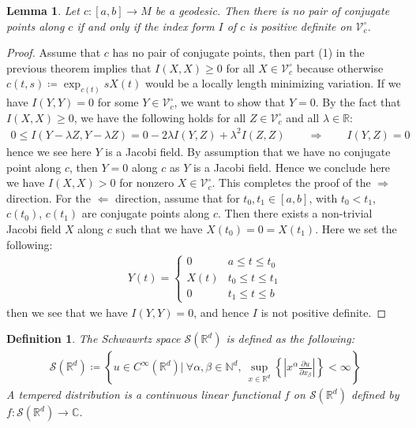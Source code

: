\documentclass[11pt]{book}
\theoremstyle{break}
\theoremstyle{break}
\newtheorem{lem}{Lemma}[thm]
\newtheorem{defn}{Definition}[corL]
\newcommand{\R}{\mathbb{R}}
\newcommand{\N}{\mathbb{N}}
\newcommand{\C}{\mathbb{C}}
\newcommand{\pd}{\partial}
\begin{document}
\begin{lem}
Let $c:[a,b] \to M$ be a geodesic. Then there is no pair of conjugate points along $c$ if and only if the index form $I$ of $c$ is positive definite on $\mathcal{V}_c^\circ$. 
\end{lem}
\begin{proof}
Assume that $c$ has no pair of conjugate points, then part (1) in the previous theorem implies that $I(X,X) \geq 0$ for all $X \in \mathcal{V}_c^\circ$ because otherwise $c(t,s) \coloneqq \exp_{c(t)}sX(t)$ would be a locally length minimizing variation. If we have $I(Y,Y) = 0$ for some $Y \in \mathcal{V}_c^\circ$, we want to show that $Y = 0$. By the fact that $I(X,X) \geq 0$, we have the following holds for all $Z \in \mathcal{V}_c^\circ$ and all $\lambda \in \R$:
\begin{align*}
0\leq I(Y - \lambda Z , Y-\lambda Z) = 0 - 2\lambda I(Y,Z)+\lambda^2 I(Z,Z) \qquad \Rightarrow \qquad I(Y,Z) = 0
\end{align*}
hence we see here $Y$ is a Jacobi field. By assumption that we have no conjugate point along $c$, then $Y = 0$ along $c$ as $Y$ is a Jacobi field. Hence we conclude here we have $I(X,X) >0$ for nonzero $X \in \mathcal{V}_c^\circ$. This completes the proof of the $\Rightarrow$ direction. For the $\Leftarrow$ direction, assume that for $t_0,t_1 \in [a,b]$, with $t_0<t_1$, $c(t_0)$, $c(t_1)$ are conjugate points along $c$. Then there exists a non-trivial Jacobi field $X$ along $c$ such that we have $X(t_0) = 0 = X(t_1)$. Here we set the following:
\begin{align*}
Y(t) = \begin{cases}
0 & a\leq t \leq t_0 \\
X(t) & t_0 \leq t \leq t_1 \\
0 & t_1 \leq t \leq b
\end{cases}
\end{align*}
then we see that we have $I(Y,Y) = 0$, and hence $I$ is not positive definite. 
\end{proof}

\begin{defn}
The Schwawrtz space $\mathcal{S}(\R^d)$ is defined as the following:
\begin{align*}
\mathcal{S}(\R^d) \coloneqq
\left\{
u \in C^\infty (\R^d)|\ \forall \alpha,\beta \in \N^d,\ \sup_{x\in \R^d}\left\{\left|x^\alpha \frac{\pd u}{\pd x_\beta}\right|\right\}<\infty
\right\}
\end{align*}
A tempered distribution is a continuous linear functional $f$ on $\mathcal{S}(\R^d)$ defined by $f:\mathcal{S}(\R^d) \to \C$. 
\end{defn}
\end{document}
